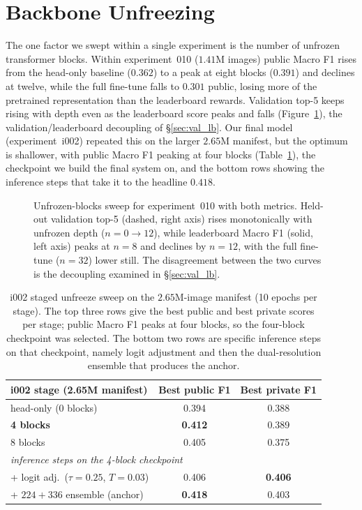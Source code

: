 \section{Backbone Unfreezing}
\label{sec:blocks_ablation}

The one factor we swept within a single experiment is the number of unfrozen transformer blocks. Within experiment~010 ($1.41$M images) public Macro F1 rises from the head-only baseline ($0.362$) to a peak at eight blocks ($0.391$) and declines at twelve, while the full fine-tune falls to $0.301$ public, losing more of the pretrained representation than the leaderboard rewards. Validation top-5 keeps rising with depth even as the leaderboard score peaks and falls (Figure~\ref{fig:unfreeze_sweep}), the validation/leaderboard decoupling of \S\ref{sec:val_lb}. Our final model (experiment~i002) repeated this on the larger $2.65$M manifest, but the optimum is shallower, with public Macro F1 peaking at four blocks (Table~\ref{tab:blocks_i002}), the checkpoint we build the final system on, and the bottom rows showing the inference steps that take it to the headline $0.418$.

\begin{figure}[ht]
  \centering
  \resizebox{0.95\linewidth}{!}{}
  \caption{Unfrozen-blocks sweep for experiment~010 with both metrics. Held-out validation top-5 (dashed, right axis) rises monotonically with unfrozen depth ($n{=}0\rightarrow12$), while leaderboard Macro F1 (solid, left axis) peaks at $n{=}8$ and declines by $n{=}12$, with the full fine-tune ($n{=}32$) lower still. The disagreement between the two curves is the decoupling examined in \S\ref{sec:val_lb}.}
  \label{fig:unfreeze_sweep}
\end{figure}

\begin{table}[ht]
  \centering
  \small
  \begin{tabular}{lcc}
    \toprule
    i002 stage (2.65M manifest) & Best public F1 & Best private F1 \\
    \midrule
    head-only (0 blocks)         & 0.394 & 0.388 \\
    \textbf{4 blocks} & \textbf{0.412} & 0.389 \\
    8 blocks                     & 0.405 & 0.375 \\
    \midrule
    \multicolumn{3}{l}{\emph{inference steps on the 4-block checkpoint}}\\
    \quad + logit adj.\ ($\tau{=}0.25$, $T{=}0.03$) & 0.406 & \textbf{0.406} \\
    \quad + $224{+}336$ ensemble (anchor)            & \textbf{0.418} & 0.403 \\
    \bottomrule
  \end{tabular}
  \caption{i002 staged unfreeze sweep on the $2.65$M-image manifest (10 epochs per stage). The top three rows give the best public and best private scores per stage; public Macro F1 peaks at four blocks, so the four-block checkpoint was selected. The bottom two rows are specific inference steps on that checkpoint, namely logit adjustment and then the dual-resolution ensemble that produces the anchor.}
  \label{tab:blocks_i002}
\end{table}

